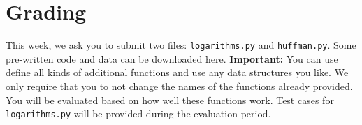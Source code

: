 \documentclass[11pt, leqno, a4paper]{article}
\begin{document}

\section{Grading}
This week, we ask you to submit two files: \texttt{logarithms.py} and \texttt{huffman.py}. Some pre-written code and data can be downloaded \href{https://github.com/BasicProbability/BasicProbability.github.io/raw/master/Homework/Programming/2016-17/Assignment3/assignment3_prerequisites.zip}{here}.
\textbf{Important:} You can use define all kinds of additional
functions and use any data structures you like. We only require that
you to not change the
names of the functions already provided. You will be evaluated based on how well these functions work. Test cases for \texttt{logarithms.py} will
be provided during the evaluation period.
\end{document}
